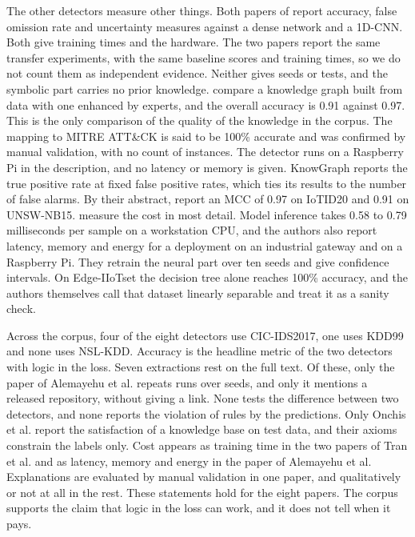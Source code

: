 The other detectors measure other things. Both papers of
\citet{tran2025odxu,tran2025transfer} report accuracy, false omission rate and
uncertainty measures against a dense network and a 1D-CNN. Both give
training times and the hardware. The two papers report the same transfer
experiments, with the same baseline scores and training times, so we do not
count them as independent evidence. Neither gives seeds or tests, and the
symbolic part carries no prior knowledge. \citet{kalutharage2025neurosymbolic}
compare a knowledge graph built from data with one enhanced by experts, and the
overall accuracy is 0.91 against 0.97. This is the only comparison of the
quality of the knowledge in the corpus. The mapping to MITRE ATT\&CK is said to
be 100\% accurate and was confirmed by manual validation, with no count of
instances. The detector runs on a Raspberry Pi in the description, and no latency
or memory is given. KnowGraph reports the true positive rate at fixed false
positive rates, which ties its results to the number of false alarms. By their abstract,
\citet{aresrobledo2025hyperparameter} report an MCC of 0.97 on IoTID20 and 0.91 on
UNSW-NB15. \citet{alemayehu2026deployment} measure the cost in most detail. Model
inference takes 0.58 to 0.79 milliseconds per sample on a workstation CPU, and
the authors also report latency, memory and energy for a deployment on an
industrial gateway and on a Raspberry Pi. They retrain the neural part over ten seeds and give
confidence intervals. On Edge-IIoTset the decision tree alone reaches 100\%
accuracy, and the authors themselves call that dataset linearly separable and
treat it as a sanity check.

Across the corpus, four of the eight detectors use CIC-IDS2017, one uses KDD99
and none uses NSL-KDD. Accuracy is the headline metric of the two detectors with
logic in the loss. Seven extractions rest on the full text. Of these, only the
paper of Alemayehu et al. repeats runs over seeds, and only it mentions a
released repository, without giving a link. None tests the difference between
two detectors, and none reports the violation of rules by the predictions. Only
Onchis et al. report the satisfaction of a knowledge base on test data, and their
axioms constrain the labels only. Cost
appears as training time in the two papers of Tran et al. and as latency,
memory and energy in the paper of Alemayehu et al. Explanations are evaluated by
manual validation in one paper, and qualitatively or not at all in the rest. These statements hold for
the eight papers. The corpus supports the claim that logic in the loss can work,
and it does not tell when it pays.

